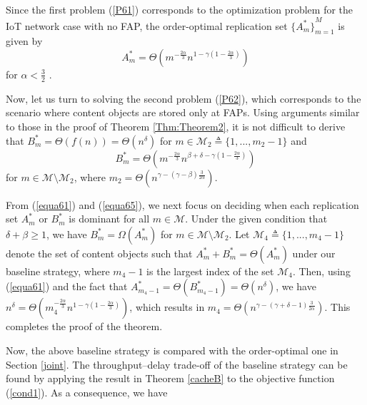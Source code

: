 \documentclass[10pt,journal,compsoc,onecolumn]{IEEEtran}
\begin{document}
\begin{IEEEproof}
Since the first problem (\ref{P61}) corresponds to the
optimization problem for the IoT network case with no FAP, the
order-optimal replication set ${\lbrace A_m^* \rbrace}^M_{m=1}$ is given
by
\begin{equation}
\label{equa61}
A^{*}_m=
 \Theta\left(m^{-\frac{2\alpha}{3}}n^{1-\gamma\left(1-\frac{2\alpha}{3}\right)}\right)
\end{equation}
for $\alpha<\frac{3}{2}$ \cite{a1}.

Now, let us turn to solving the second problem (\ref{P62}), which
corresponds to the scenario where content objects are stored only
at FAPs. Using arguments similar to those in the proof of Theorem
\ref{Thm:Theorem2}, it is not difficult to derive that
$B_m^*=\Theta\left(f(n)\right)=\Theta\left(n^\delta\right)$ for $m
\in \mathcal{M}_2 \triangleq \lbrace1,...,m_2-1\rbrace$ and
\begin{equation}
\label{equa65}
B^{*}_m=\Theta\left(m^{-\frac{2\alpha}{3}}n^{\beta+\delta-\gamma\left(1-\frac{2\alpha}{3}\right)}\right)
\end{equation}
for $m \in \mathcal{M}\setminus \mathcal{M}_2$, where $m_2=\Theta\left(n^{\gamma-(\gamma-\beta)\frac{3}{2\alpha}}\right)$.\par
From (\ref{equa61}) and (\ref{equa65}), we next focus on deciding when each replication set $A_m^*$ or $B_m^*$ is dominant for all $m \in \mathcal{M}$. Under the given condition that $\delta+\beta\geq 1$, we have $B^{*}_m=\Omega(A^{*}_m)$ for $m \in \mathcal{M}\setminus \mathcal{M}_2$. Let $\mathcal{M}_4\triangleq\lbrace 1,...,m_4-1 \rbrace$ denote the set of content objects such that $A_m^*+B_m^*=\Theta(A^{*}_m)$ under our baseline strategy, where $m_4-1$ is the largest index of the set $\mathcal{M}_4$. Then, using (\ref{equa61}) and the fact that $A_{m_4-1}^*=\Theta\left(B_{m_4-1}^*\right)=\Theta\left(n^\delta\right)$, we have $n^\delta=  \Theta\left(m_4^{-\frac{2\alpha}{3}}n^{1-\gamma\left(1-\frac{2\alpha}{3}\right)}\right)$, which results in $m_4=\Theta\left(n^{\gamma-(\gamma+\delta-1)\frac{3}{2\alpha}}\right)$. This completes the proof of the theorem.
\end{IEEEproof}
Now, the above baseline strategy is compared with the order-optimal one in Section \ref{joint}. The throughput--delay trade-off of the baseline strategy can be found by applying the result in Theorem \ref{cacheB} to the objective function (\ref{cond1}). As a consequence, we have
\end{document}
